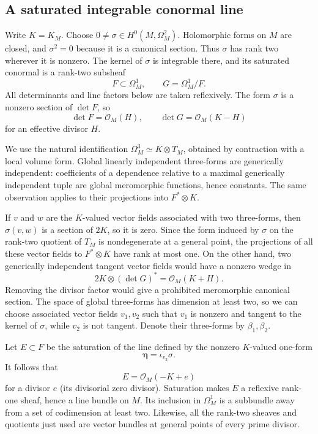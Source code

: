 \documentclass[11pt,letterpaper]{article}
\theoremstyle{definition}
\theoremstyle{remark}
\begin{document}
\subsection{A saturated integrable conormal line}

Write $K=K_M$.  Choose $0\ne\sigma\in H^0(M,\Omega_M^2)$.  Holomorphic
forms on $M$ are closed, and $\sigma^2=0$ because it is a canonical
section.  Thus $\sigma$ has rank two wherever it is nonzero.  The kernel
of $\sigma$ is integrable there, and its saturated conormal is a rank-two
subsheaf
\[
 F\subset\Omega_M^1,\qquad G=\Omega_M^1/F.
\]
All determinants and line factors below are taken reflexively.  The form
$\sigma$ is a nonzero section of $\det F$, so
\begin{equation}\label{fol:F-and-G}
 \det F=\mathcal{O}_M(H),\qquad \det G=\mathcal{O}_M(K-H)
\end{equation}
for an effective divisor $H$.

We use the natural identification
$\Omega_M^3\simeq K\otimes T_M$, obtained by contraction with a local
volume form.  Global linearly independent three-forms are generically
independent: coefficients of a dependence relative to a maximal
generically independent tuple are global meromorphic functions, hence
constants.  The same observation applies to their projections into
$F^*\otimes K$.

If $v$ and $w$ are the $K$-valued vector fields associated with two
three-forms, then $\sigma(v,w)$ is a section of $2K$, so it is zero.
Since the form induced by $\sigma$ on the rank-two quotient of $T_M$ is
nondegenerate at a general point, the projections of all these vector
fields to $F^*\otimes K$ have rank at most one.  On the other hand, two
generically independent tangent vector fields would have a nonzero
wedge in
\[
 2K\otimes(\det G)^*=\mathcal{O}_M(K+H).
\]
Removing the divisor factor would give a prohibited meromorphic
canonical section.  The space of global three-forms has dimension at
least two, so we can choose associated vector fields $v_1,v_2$ such that
$v_1$ is nonzero and tangent to the kernel of $\sigma$, while $v_2$ is
not tangent.  Denote their three-forms by $\beta_1,\beta_2$.

Let $E\subset F$ be the saturation of the line defined by the nonzero
$K$-valued one-form
\[
 \boldsymbol\eta=\iota_{v_2}\sigma.
\]
It follows that
\begin{equation}\label{fol:E-class}
 E=\mathcal{O}_M(-K+e)
\end{equation}
for a divisor $e$ (its divisorial zero divisor).  Saturation makes $E$ a
reflexive rank-one sheaf, hence a line bundle on $M$.  Its inclusion in
$\Omega_M^1$ is a subbundle away from a set of codimension at least two.
Likewise, all the rank-two sheaves and quotients just used are vector
bundles at general points of every prime divisor.
\end{document}
